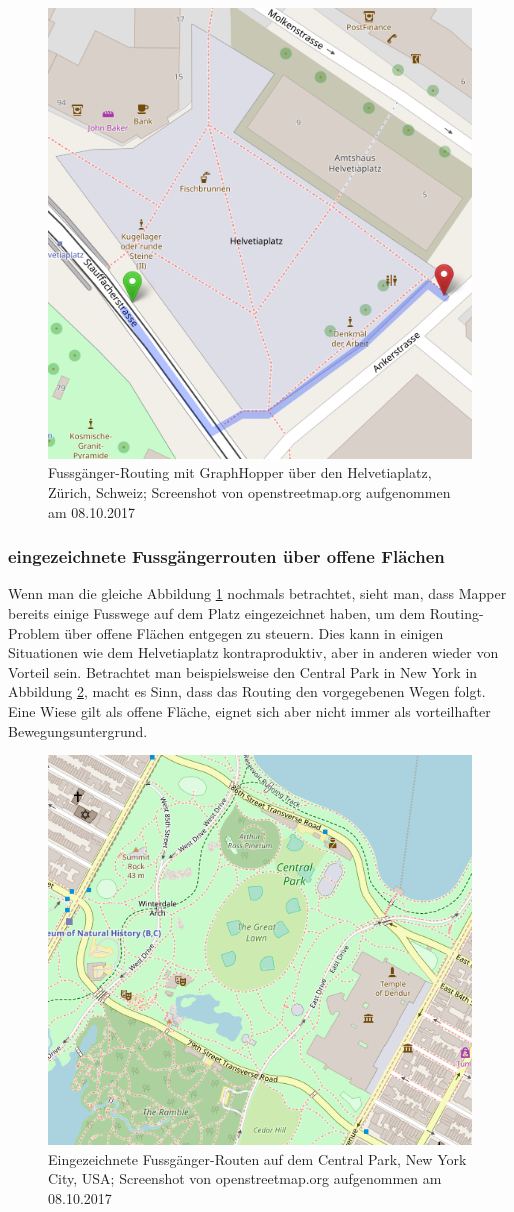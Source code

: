 \begin{figure}[ht]
	\centering
	\includegraphics[width=0.5\linewidth]{technicalreport/img/helvetiaplatz_graphhopper}
	\caption[Fussgänger-Routing]{Fussgänger-Routing mit GraphHopper \cite{graphhopper} über den Helvetiaplatz, Zürich, Schweiz; Screenshot von openstreetmap.org aufgenommen am 08.10.2017}
	\label{fig:helvetiaplatz_graphhopper}
\end{figure}

\subsubsection{eingezeichnete Fussgängerrouten über offene Flächen}
\label{problem:eingezeichnete Fussgängerrouten über offene Flächen}
Wenn man die gleiche Abbildung \ref{fig:helvetiaplatz_graphhopper} nochmals betrachtet, sieht man, dass Mapper bereits einige Fusswege auf dem Platz eingezeichnet haben, um dem Routing-Problem über offene Flächen entgegen zu steuern. Dies kann in einigen Situationen wie dem Helvetiaplatz kontraproduktiv, aber in anderen wieder von Vorteil sein. Betrachtet man beispielsweise den Central Park in New York in Abbildung \ref{fig:central_park}, macht es Sinn, dass das Routing den vorgegebenen Wegen folgt. Eine Wiese gilt als offene Fläche, eignet sich aber nicht immer als vorteilhafter Bewegungsuntergrund. 

\begin{figure}[ht]
\centering
\includegraphics[width=0.5\linewidth]{technicalreport/img/central_park}
\caption[eingezeichnete Fussgänger-Routen]{Eingezeichnete Fussgänger-Routen auf dem Central Park, New York City, USA; Screenshot von openstreetmap.org aufgenommen am 08.10.2017}
\label{fig:central_park}
\end{figure}

